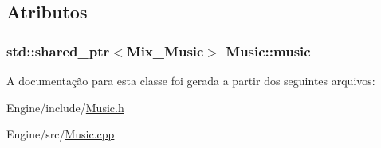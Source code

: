 \subsection{Atributos}
\hypertarget{classMusic_a6cddb36711f395497d2daf3e3c955912}{
\subsubsection[{music}]{\setlength{\rightskip}{0pt plus 5cm}std\+::shared\+\_\+ptr$<$Mix\+\_\+\+Music$>$ Music\+::music\hspace{0.3cm}{\ttfamily [private]}}}\label{classMusic_a6cddb36711f395497d2daf3e3c955912}


A documentação para esta classe foi gerada a partir dos seguintes arquivos\+:\begin{DoxyCompactItemize}
\item 
Engine/include/\hyperlink{Music_8h}{Music.\+h}\item 
Engine/src/\hyperlink{Music_8cpp}{Music.\+cpp}\end{DoxyCompactItemize}
